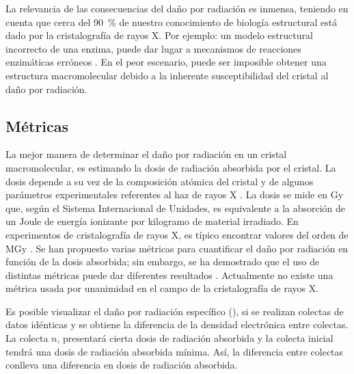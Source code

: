 La relevancia de las consecuencias del daño por radiación es inmensa, teniendo en cuenta que cerca del \SI{90}{\percent} de nuestro conocimiento de biología estructural está dado por la cristalografía de rayos X. Por ejemplo: un modelo estructural incorrecto de una enzima, puede dar lugar a mecanismos de reacciones enzimáticas erróneos . En el peor escenario, puede ser imposible obtener una estructura macromolecular debido a la inherente susceptibilidad del cristal al daño por radiación.

\subsection{Métricas}
La mejor manera de determinar el daño por radiación en un cristal macromolecular, es estimando la dosis de radiación absorbida por el cristal. La dosis depende a su vez de la composición atómica del cristal y de algunos parámetros experimentales referentes al haz de rayos X . La dosis se mide en \si{\gray} que, según el Sistema Internacional de Unidades, es equivalente a la absorción de un Joule de energía ionizante por kilogramo de material irradiado. En experimentos de cristalografía de rayos X, es típico encontrar valores del orden de \si{\mega\gray} . Se han propuesto varias métricas para cuantificar el daño por radiación en función de la dosis absorbida; sin embargo, se ha demostrado que el uso de distintas métricas puede dar diferentes resultados . Actualmente no existe una métrica usada por unanimidad en el campo de la cristalografía de rayos X. 

Es posible visualizar el daño por radiación específico (), si se realizan colectas de datos idénticas y se obtiene la diferencia de la densidad electrónica entre colectas. La colecta $n$, presentará cierta dosis de radiación absorbida y la colecta inicial tendrá una dosis de radiación absorbida mínima. Así, la diferencia entre colectas conlleva una diferencia en dosis de radiación absorbida.


